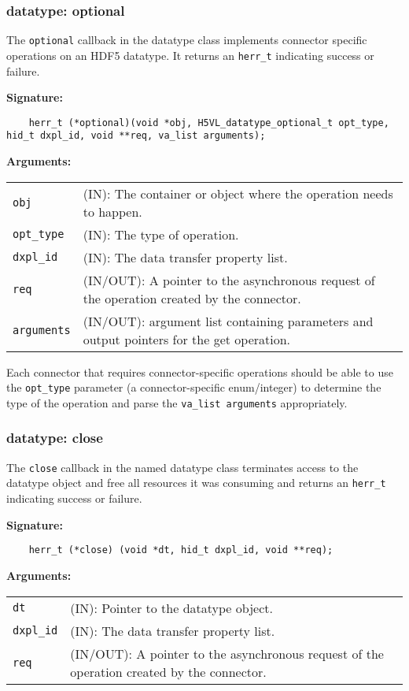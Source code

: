 \subsubsection{datatype: optional}
The \texttt{optional} callback in the datatype class implements connector specific operations on an HDF5 datatype. It returns an \texttt{herr\_t} indicating success or failure.\bigskip 

\begin{mdframed}[style=bgbox]
\textbf{Signature:}
\begin{lstlisting}
    herr_t (*optional)(void *obj, H5VL_datatype_optional_t opt_type, hid_t dxpl_id, void **req, va_list arguments);
\end{lstlisting}

\textbf{Arguments:}\\
\begin{tabular}{l p{13.5cm}}
  \texttt{obj} & (IN): The container or object where the operation needs to happen.\\
  \texttt{opt\_type} & (IN): The type of operation.\\
  \texttt{dxpl\_id} & (IN): The data transfer property list.\\
  \texttt{req} & (IN/OUT): A pointer to the asynchronous request of the operation created by the connector.\\
  \texttt{arguments} & (IN/OUT): argument list containing parameters and output pointers for the get operation. \\
\end{tabular}
\end{mdframed}

Each connector that requires connector-specific operations should be able to use the \texttt{opt\_type} parameter (a connector-specific enum/integer) to determine the type of the operation and parse the \texttt{va\_list arguments} appropriately.

\subsubsection{datatype: close}
The \texttt{close} callback in the named datatype class terminates
access to the datatype object and free all resources it was
consuming and returns an \texttt{herr\_t} indicating success or failure.\bigskip

\begin{mdframed}[style=bgbox]
\textbf{Signature:}
\begin{lstlisting}
    herr_t (*close) (void *dt, hid_t dxpl_id, void **req);
\end{lstlisting}

\textbf{Arguments:}\\
\begin{tabular}{l p{13.5cm}}
  \texttt{dt} & (IN): Pointer to the datatype object.\\
  \texttt{dxpl\_id} & (IN): The data transfer property list.\\
  \texttt{req} & (IN/OUT): A pointer to the asynchronous request of the
  operation created by the connector.\\
\end{tabular}
\end{mdframed}

